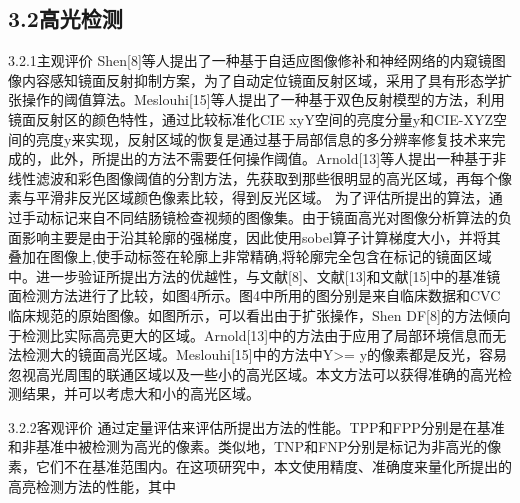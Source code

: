 \documentclass[UTF8,a4paper,12pt]{ctexart}
\begin{document}
\subsection{3.2高光检测}
3.2.1主观评价
Shen[8]等人提出了一种基于自适应图像修补和神经网络的内窥镜图像内容感知镜面反射抑制方案，为了自动定位镜面反射区域，采用了具有形态学扩张操作的阈值算法。Meslouhi[15]等人提出了一种基于双色反射模型的方法，利用镜面反射区的颜色特性，通过比较标准化CIE xyY空间的亮度分量y和CIE-XYZ空间的亮度y来实现，反射区域的恢复是通过基于局部信息的多分辨率修复技术来完成的，此外，所提出的方法不需要任何操作阈值。Arnold[13]等人提出一种基于非线性滤波和彩色图像阈值的分割方法，先获取到那些很明显的高光区域，再每个像素与平滑非反光区域颜色像素比较，得到反光区域。
为了评估所提出的算法，通过手动标记来自不同结肠镜检查视频的图像集。由于镜面高光对图像分析算法的负面影响主要是由于沿其轮廓的强梯度，因此使用sobel算子计算梯度大小，并将其叠加在图像上,使手动标签在轮廓上非常精确,将轮廓完全包含在标记的镜面区域中。进一步验证所提出方法的优越性，与文献[8]、文献[13]和文献[15]中的基准镜面检测方法进行了比较，如图4所示。图4中所用的图分别是来自临床数据和CVC临床规范的原始图像。如图所示，可以看出由于扩张操作，Shen DF[8]的方法倾向于检测比实际高亮更大的区域。Arnold[13]中的方法由于应用了局部环境信息而无法检测大的镜面高光区域。Meslouhi[15]中的方法中Y>= y的像素都是反光，容易忽视高光周围的联通区域以及一些小的高光区域。本文方法可以获得准确的高光检测结果，并可以考虑大和小的高光区域。
\begin{figure}[H]   %
\centering
{}
  \hspace{0cm}      %
\centering
{}
\caption{}\label{fig}
\end{figure}%
\begin{figure}[H]   %
\centering
{}
  \hspace{0cm}      %
\centering
{}
\caption{}\label{fig}
\end{figure}

3.2.2客观评价
通过定量评估来评估所提出方法的性能。TPP和FPP分别是在基准和非基准中被检测为高光的像素。类似地，TNP和FNP分别是标记为非高光的像素，它们不在基准范围内。在这项研究中，本文使用精度、准确度来量化所提出的高亮检测方法的性能，其中
\end{document}
